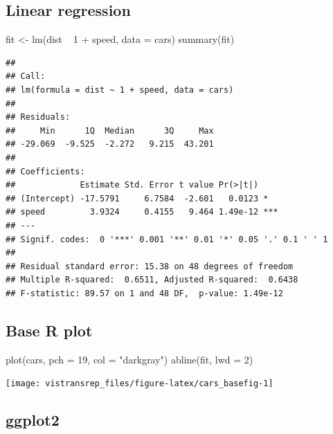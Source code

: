 \documentclass[]{book}
\newenvironment{Shaded}{}{}
\newcommand{\DataTypeTok}[1]{#1}
\newcommand{\DecValTok}[1]{#1}
\newcommand{\KeywordTok}[1]{\textcolor[rgb]{0.00,0.00,1.00}{#1}}
\newcommand{\NormalTok}[1]{#1}
\newcommand{\OperatorTok}[1]{#1}
\newcommand{\StringTok}[1]{\textcolor[rgb]{0.00,0.50,0.50}{#1}}
\begin{document}
\hypertarget{linear-regression}{%
\subsection{Linear regression}\label{linear-regression}}

\begin{Shaded}
\begin{Highlighting}[]
\NormalTok{fit <-}\StringTok{ }\KeywordTok{lm}\NormalTok{(dist }\OperatorTok{~}\StringTok{ }\DecValTok{1} \OperatorTok{+}\StringTok{ }\NormalTok{speed, }\DataTypeTok{data =}\NormalTok{ cars)}
\KeywordTok{summary}\NormalTok{(fit)}
\end{Highlighting}
\end{Shaded}

\begin{verbatim}
## 
## Call:
## lm(formula = dist ~ 1 + speed, data = cars)
## 
## Residuals:
##     Min      1Q  Median      3Q     Max 
## -29.069  -9.525  -2.272   9.215  43.201 
## 
## Coefficients:
##             Estimate Std. Error t value Pr(>|t|)    
## (Intercept) -17.5791     6.7584  -2.601   0.0123 *  
## speed         3.9324     0.4155   9.464 1.49e-12 ***
## ---
## Signif. codes:  0 '***' 0.001 '**' 0.01 '*' 0.05 '.' 0.1 ' ' 1
## 
## Residual standard error: 15.38 on 48 degrees of freedom
## Multiple R-squared:  0.6511, Adjusted R-squared:  0.6438 
## F-statistic: 89.57 on 1 and 48 DF,  p-value: 1.49e-12
\end{verbatim}

\hypertarget{base-r-plot}{%
\subsection{Base R plot}\label{base-r-plot}}

\begin{Shaded}
\begin{Highlighting}[]
\KeywordTok{plot}\NormalTok{(cars, }\DataTypeTok{pch =} \DecValTok{19}\NormalTok{, }\DataTypeTok{col =} \StringTok{"darkgray"}\NormalTok{)}
\KeywordTok{abline}\NormalTok{(fit, }\DataTypeTok{lwd =} \DecValTok{2}\NormalTok{)}
\end{Highlighting}
\end{Shaded}

\begin{flushright}\texttt{[image: vistransrep\_files/figure-latex/cars\_basefig-1]} \end{flushright}

\hypertarget{ggplot2}{%
\subsection{ggplot2}\label{ggplot2}}
\end{document}
